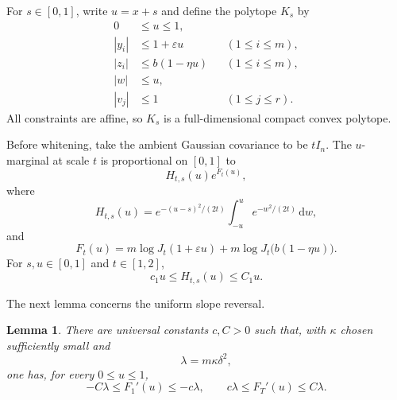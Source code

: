 \documentclass[11pt]{article}
\numberwithin{equation}{section}
\newtheorem{lemma}{Lemma}[section]
\theoremstyle{definition}
\begin{document}
For $s\in[0,1]$, write
$u=x+s$ and define the polytope
$K_s$ by
\begin{equation}
  \begin{aligned}
    0&\leq u\leq1,\\
    |y_i|&\leq1+\varepsilon u &&(1\leq i\leq m),\\
    |z_i|&\leq b(1-\eta u) &&(1\leq i\leq m),\\
    |w|&\leq u,\\
    |v_j|&\leq1 &&(1\leq j\leq r).
  \end{aligned}
  \label{app:warming:eq:polytope}
\end{equation}
All constraints are affine, so $K_s$ is a full-dimensional compact convex
polytope.

Before whitening, take the ambient Gaussian covariance to be $tI_n$.
The $u$-marginal at scale
$t$ is proportional on
$[0,1]$ to
\begin{equation}
  H_{t,s}(u)e^{F_t(u)},
  \label{app:warming:eq:u-marginal}
\end{equation}
where
\begin{equation}
  H_{t,s}(u)
  =e^{-(u-s)^2/(2t)}\int_{-u}^{u}e^{-w^2/(2t)}\,\mathrm dw,
  \label{app:warming:eq:H}
\end{equation}
and
\begin{equation}
  F_t(u)
  =m\log J_t(1+\varepsilon u)
   +m\log J_t\bigl(b(1-\eta u)\bigr).
  \label{app:warming:eq:F}
\end{equation}
For $s,u\in[0,1]$ and
$t\in[1,2]$,
\begin{equation}
c_1u
\leq H_{t,s}(u)
\leq C_1u.
\label{app:warming:eq:H-comparison}
\end{equation}

The next lemma concerns the uniform slope reversal.

\begin{lemma}
\label{app:warming:lem:slope-reversal}
There are universal constants $c,C>0$ such that, with
$\kappa$ chosen sufficiently small and
\begin{equation}
  \lambda=m\kappa\delta^2,
  \label{app:warming:eq:lambda}
\end{equation}
one has, for every $0\leq u\leq1$,
\begin{equation}
-C\lambda
\leq F_1'(u)
\leq-c\lambda,
\qquad
c\lambda
\leq F_T'(u)
\leq C\lambda.
\label{app:warming:eq:slope-reversal}
\end{equation}
\end{lemma}
\end{document}
